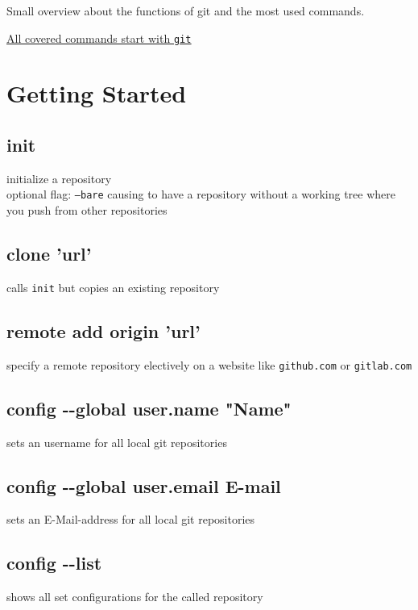 Small overview about the functions of git and the most used commands.
\begin{center}
	\underline{\underline{All covered commands start with \texttt{git}}}\\
\end{center}

\section*{Getting Started}


\subsection*{init} 
initialize a repository\\
optional flag: \texttt{---bare} causing to have 
a repository without a working tree where you push from other repositories \\ 

\subsection*{clone 'url'}
calls \texttt{init} but copies an existing repository\\

\subsection*{remote add origin 'url'}
specify a remote repository electively on a website like \texttt{github.com} or \texttt{gitlab.com}\\

\subsection*{config -{}-global user.name "Name"}
sets an username for all local git repositories\\

\subsection*{config -{}-global user.email E-mail}
sets an E-Mail-address for all local git repositories\\

\subsection*{config -{}-list}
shows all set configurations for the called repository \\


